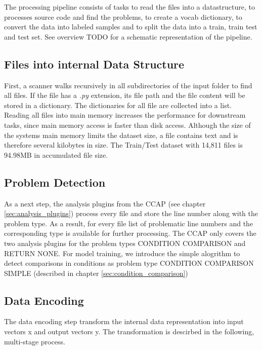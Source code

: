 The processing pipeline consists of tasks to read the files into a datastructure, to processes source code and find the problems, to create a vocab dictionary, to convert the data into labeled samples and to split the data into a train, train test and test set. See overview TODO for a schematic representation of the pipeline.

\subsection{Files into internal Data Structure}
First, a scanner walks recursively in all subdirectories of the input folder to find all files. If the file has a \textit{.py} extension, its file path and the file content will be stored in a dictionary. The dictionaries for all file are collected into a list. 
Reading all files into main memory increases the performance for downstream tasks, since main memory access is faster than disk access. Although the size of the systems main memory limits the dataset size, a file contains text and is therefore several kilobytes in size. The Train/Test dataset with 14,811 files is 94.98MB in accumulated file size.

\subsection{Problem Detection}\label{sec:problem_detection}
As a next step, the analysis plugins from the CCAP (see chapter \ref{sec:analysis_plugins}) process every file and store the line number along with the problem type. As a result, for every file list of problematic line numbers and the corresponding type is available for further processing. The CCAP only covers the two analysis plugins for the problem types CONDITION COMPARISON and RETURN NONE. For model training, we introduce the simple alogrithm to detect comparisons in conditions as problem type CONDITION COMPARISON SIMPLE (described in chapter \ref{sec:condition_comparison})



\subsection{Data Encoding}\label{sec:data_encoding}
The data encoding step transform the internal data representation into input vectors x and output vectors y. The transformation is descirbed in the following, multi-stage process.

